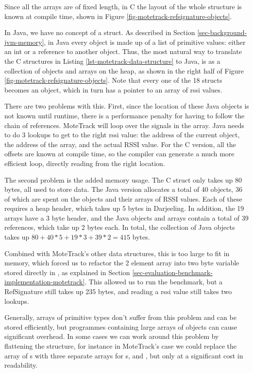 Since all the arrays are of fixed length, in C the layout of the whole structure is known at compile time, shown in Figure \ref{fig-motetrack-refsignature-objects}.

In Java, we have no concept of a struct. As described in Section \ref{sec-background-jvm-memory}, in Java every object is made up of a list of primitive values: either an int or a reference to another object. Thus, the most natural way to translate the C structures in Listing \ref{lst-motetrack-data-structure} to Java, is as a collection of objects and arrays on the heap, as shown in the right half of Figure \ref{fig-motetrack-refsignature-objects}. Note that every one of the 18  structs becomes an object, which in turn has a pointer to an array of rssi values.

There are two problems with this. First, since the location of these Java objects is not known until runtime, there is a performance penalty for having to follow the chain of references. MoteTrack will loop over the signals in the  array. Java needs to do 3 lookups to get to the right rssi value: the address of the current  object, the address of the  array, and the actual RSSI value. For the C version, all the offsets are known at compile time, so the compiler can generate a much more efficient loop, directly reading from the right location.

The second problem is the added memory usage. The C struct only takes up 80 bytes, all used to store data. The Java version allocates a total of 40 objects, 36 of which are spent on the  objects and their arrays of RSSI values. Each of these requires a heap header, which takes up 5 bytes in Darjeeling. In addition, the 19 arrays have a 3 byte header, and the Java objects and arrays contain a total of 39 references, which take up 2 bytes each. In total, the collection of Java objects takes up $80 + 40*5 + 19*3 + 39*2 = 415$ bytes.

Combined with MoteTrack's other data structures, this is too large to fit in memory, which forced us to refactor the 2 element  array into two byte variable stored directly in , as explained in Section \ref{sec-evaluation-benchmark-implementation-motetrack}. This allowed us to run the benchmark, but a RefSignature still takes up 235 bytes, and reading a rssi value still takes two lookups.

Generally, arrays of primitive types don't suffer from this problem and can be stored efficiently, but programmes containing large arrays of objects can cause significant overhead. In some cases we can work around this problem by flattening the structure, for instance in MoteTrack's case we could replace the array of s with three separate arrays for s,  and , but only at a significant cost in readability.




